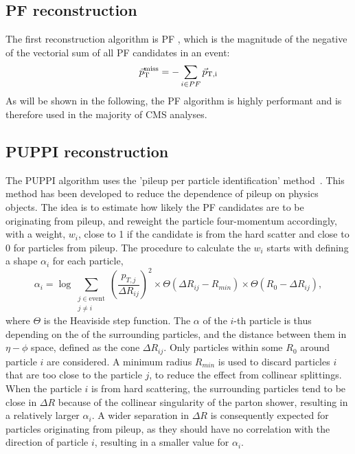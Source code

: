 \subsection{PF \ptmiss reconstruction}
The first reconstruction algorithm is PF \ptmiss, which is the magnitude of the negative of the vectorial sum of all PF candidates in an event:
\begin{equation}
\vec{p}_{\mathrm{T}}^{\mathrm{miss}} =- \sum_{i\in PF} \vec{p}_{\mathrm{T, i}}
\label{eq:MET}
\end{equation}                                                                      
As will be shown in the following, the PF \ptmiss algorithm is highly performant and is therefore used in the majority of CMS analyses.
 
\subsection{PUPPI \ptmiss reconstruction}
The PUPPI \ptmiss algorithm uses the 'pileup per particle identification' method~\cite{Bertolini:2014bba}. This method has been developed to reduce the dependence of pileup on physics objects. 
The idea is to estimate how likely the PF candidates are to be originating from pileup, and reweight the particle four-momentum accordingly, with a weight, $w_{i}$, close to 1 if the candidate is from the hard scatter and close to 0 for particles from pileup. 
The procedure to calculate the $w_{i}$ starts with defining a shape $\alpha_{i}$ for each particle, 
\begin{equation}
  \alpha_i = \log \sum_{\substack{j \in \text{event} \\ j \neq i}} \left(\frac{p_{T, j}}{\Delta R_{ij}}\right)^{2} \times \Theta(\Delta R_{ij}-R_{min})\times \Theta(R_{0}-\Delta R_{ij}),
\end{equation}
where $\Theta$ is the Heaviside step function. 
The $\alpha$ of the $i$-th particle is thus depending on the \pt of the surrounding particles, and the distance between them in $\eta-\phi$ space, defined as the cone $\Delta R_{ij}$.
Only particles within some $R_{0}$ around particle $i$ are considered. A minimum radius $R_{min}$ is used to discard particles $i$ that are too close to the particle $j$, to reduce the effect from collinear splittings. 
When the particle $i$ is from hard scattering, the surrounding particles tend to be close in $\Delta R$ because of the collinear singularity of the parton shower, resulting in a relatively larger $\alpha_{i}$. 
A wider separation in $\Delta R$ is consequently expected for particles originating from pileup, as they should have no correlation with the direction of particle $i$, resulting in a smaller value for $\alpha_{i}$. 
